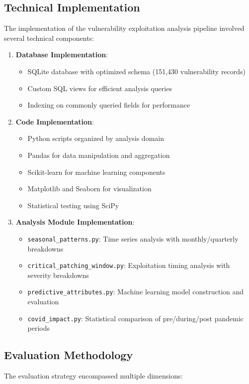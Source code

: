 \documentclass[runningheads]{llncs}
\begin{document}
\subsection{Technical Implementation}
The implementation of the vulnerability exploitation analysis pipeline involved several technical components:

\begin{enumerate}
    \item \textbf{Database Implementation}:
    \begin{itemize}
        \item SQLite database with optimized schema (151,430 vulnerability records)
        \item Custom SQL views for efficient analysis queries
        \item Indexing on commonly queried fields for performance
    \end{itemize}
    
    \item \textbf{Code Implementation}:
    \begin{itemize}
        \item Python scripts organized by analysis domain
        \item Pandas for data manipulation and aggregation
        \item Scikit-learn for machine learning components
        \item Matplotlib and Seaborn for visualization
        \item Statistical testing using SciPy
    \end{itemize}
    
    \item \textbf{Analysis Module Implementation}:
    \begin{itemize}
        \item \texttt{seasonal\_patterns.py}: Time series analysis with monthly/quarterly breakdowns
        \item \texttt{critical\_patching\_window.py}: Exploitation timing analysis with severity breakdowns
        \item \texttt{predictive\_attributes.py}: Machine learning model construction and evaluation
        \item \texttt{covid\_impact.py}: Statistical comparison of pre/during/post pandemic periods
    \end{itemize}
\end{enumerate}

\subsection{Evaluation Methodology}
The evaluation strategy encompassed multiple dimensions:
\end{document}
